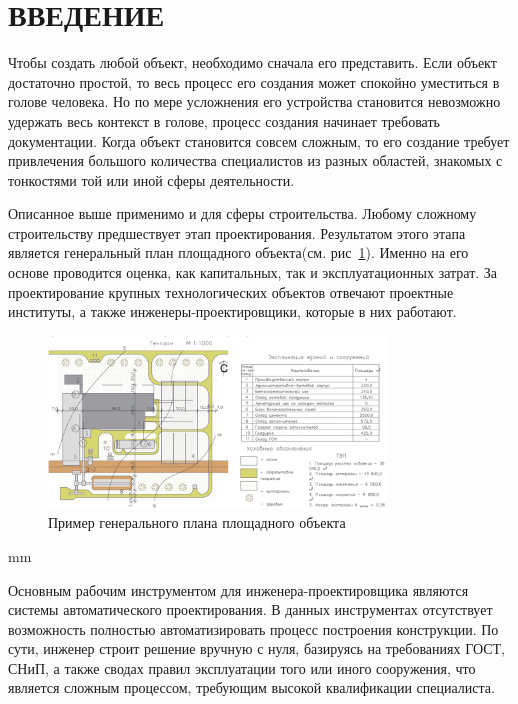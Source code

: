 \section*{\Large{ВВЕДЕНИЕ}}


Чтобы создать любой объект, необходимо сначала его представить.
Если объект достаточно простой, то весь процесс его создания может спокойно уместиться в голове человека.
Но по мере усложнения его устройства становится невозможно удержать весь контекст в голове,
процесс создания начинает требовать документации.
Когда объект становится совсем сложным, то его создание требует привлечения большого количества специалистов из разных
областей, знакомых с тонкостями той или иной сферы деятельности.

Описанное выше применимо и для сферы строительства.
Любому сложному строительству предшествует этап проектирования.
Результатом этого этапа является генеральный план площадного объекта(см. рис\ \ref{pic:introduction__site-plan}).
Именно на его основе проводится оценка, как капитальных, так и эксплуатационных затрат.
За проектирование крупных технологических объектов отвечают проектные институты,
а также инженеры-проектировщики, которые в них работают.

\begin{figure}[H]
	\vspace*{-0.4 cm}
	\includegraphics[width=0.8\textwidth]{introduction/pictures/site_plan}
	\caption{Пример генерального плана площадного объекта}
	\label{pic:introduction__site-plan}
\end{figure}
 mm

Основным рабочим инструментом для инженера-проектировщика являются системы автоматического проектирования.
В данных инструментах отсутствует возможность полностью автоматизировать процесс построения конструкции.
По сути, инженер строит решение вручную с нуля, базируясь на требованиях ГОСТ, СНиП, а также сводах правил
эксплуатации того или иного сооружения, что является сложным процессом, требующим высокой квалификации специалиста.
